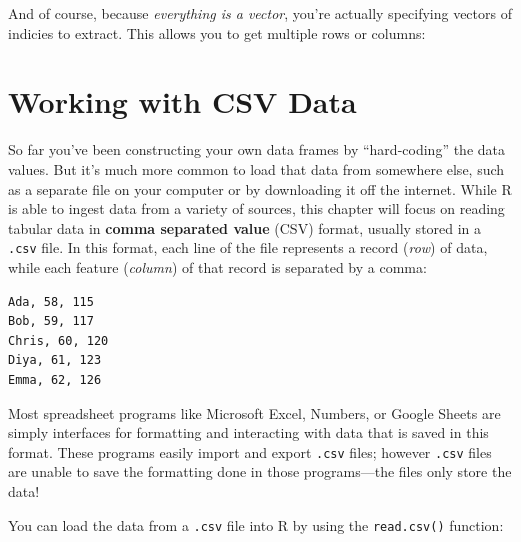 \documentclass[]{book}
\newenvironment{Shaded}{\begin{snugshade}}{\end{snugshade}}
\newcommand{\KeywordTok}[1]{\textcolor[rgb]{0.13,0.29,0.53}{\textbf{#1}}}
\newcommand{\DecValTok}[1]{\textcolor[rgb]{0.00,0.00,0.81}{#1}}
\newcommand{\StringTok}[1]{\textcolor[rgb]{0.31,0.60,0.02}{#1}}
\newcommand{\CommentTok}[1]{\textcolor[rgb]{0.56,0.35,0.01}{\textit{#1}}}
\newcommand{\OperatorTok}[1]{\textcolor[rgb]{0.81,0.36,0.00}{\textbf{#1}}}
\newcommand{\NormalTok}[1]{#1}
\theoremstyle{definition}
\theoremstyle{definition}
\theoremstyle{remark}
\begin{document}
And of course, because \emph{everything is a vector}, you're actually
specifying vectors of indicies to extract. This allows you to get
multiple rows or columns:

\begin{Shaded}
\end{Shaded}

\hypertarget{csv-files}{\section{Working with CSV
Data}\label{csv-files}}

So far you've been constructing your own data frames by ``hard-coding''
the data values. But it's much more common to load that data from
somewhere else, such as a separate file on your computer or by
downloading it off the internet. While R is able to ingest data from a
variety of sources, this chapter will focus on reading tabular data in
\textbf{comma separated value} (CSV) format, usually stored in a
\texttt{.csv} file. In this format, each line of the file represents a
record (\emph{row}) of data, while each feature (\emph{column}) of that
record is separated by a comma:

\begin{verbatim}
Ada, 58, 115
Bob, 59, 117
Chris, 60, 120
Diya, 61, 123
Emma, 62, 126
\end{verbatim}

Most spreadsheet programs like Microsoft Excel, Numbers, or Google
Sheets are simply interfaces for formatting and interacting with data
that is saved in this format. These programs easily import and export
\texttt{.csv} files; however \texttt{.csv} files are unable to save the
formatting done in those programs---the files only store the data!

You can load the data from a \texttt{.csv} file into R by using the
\texttt{read.csv()} function:
\end{document}
